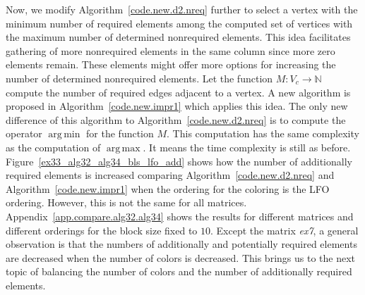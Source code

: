\documentclass[12pt, twoside,a4paper,toc=bibliography]{scrbook}
\DeclareMathOperator*{\argmin}{arg\,min}
\DeclareMathOperator*{\argmax}{arg\,max}
\newcommand{\figref}[1]{Figure~\protect\ref{#1}}
\newcommand{\coderef}[1]{Algorithm~\protect\ref{#1}}
\newcommand{\appref}[1]{Appendix~\protect\ref{#1}}
\newcommand{\req}{M}
\begin{document}
Now, we modify \coderef{code.new.d2.nreq} further to select a vertex with the minimum number of
required elements among the computed set of vertices with the maximum number of determined nonrequired elements.
This idea facilitates gathering of more nonrequired elements in the same column since
more zero elements remain. These elements might offer more options for increasing the number of determined
nonrequired elements.
Let the function $\req: V_c\rightarrow \mathbb{N}$ compute the number of required edges adjacent to a vertex.
A new algorithm is proposed in \coderef{code.new.impr1} which applies this idea.
The only new difference of this algorithm to \coderef{code.new.d2.nreq}
is to compute the operator $\argmin$ for the
function $\req$. This computation has the same complexity as the computation of $\argmax$.
It means the time complexity is still as before.
\figref{ex33_alg32_alg34_bls_lfo_add} shows how the number of additionally
required elements is increased comparing
\coderef{code.new.d2.nreq} and \coderef{code.new.impr1} when the ordering for the coloring
is the LFO ordering. However, this is not the same for all matrices.
\appref{app.compare.alg32.alg34} shows the results for different matrices
and different orderings for the block size fixed to $10$.
Except the matrix \textit{ex7},
a general observation is that the numbers of additionally and potentially required elements
are decreased when the number of colors is decreased.
This brings us to the next topic of balancing the number of colors
and the number of additionally required elements.
\end{document}
